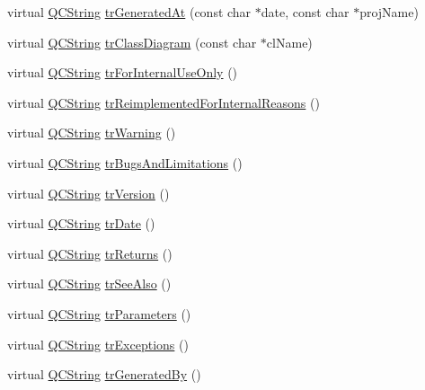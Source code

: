 \begin{DoxyCompactItemize}
\item 
virtual \mbox{\hyperlink{class_q_c_string}{Q\+C\+String}} \mbox{\hyperlink{class_translator_arabic_a044107447821682b67108e2ecfebe8bb}{tr\+Generated\+At}} (const char $\ast$date, const char $\ast$proj\+Name)
\item 
virtual \mbox{\hyperlink{class_q_c_string}{Q\+C\+String}} \mbox{\hyperlink{class_translator_arabic_a87f8377933d06087c5f870a8d72787b6}{tr\+Class\+Diagram}} (const char $\ast$cl\+Name)
\item 
virtual \mbox{\hyperlink{class_q_c_string}{Q\+C\+String}} \mbox{\hyperlink{class_translator_arabic_a18f11fe65de52452965f8b16974c144d}{tr\+For\+Internal\+Use\+Only}} ()
\item 
virtual \mbox{\hyperlink{class_q_c_string}{Q\+C\+String}} \mbox{\hyperlink{class_translator_arabic_a059a6f4e8d6d6be88c0091250b5eba77}{tr\+Reimplemented\+For\+Internal\+Reasons}} ()
\item 
virtual \mbox{\hyperlink{class_q_c_string}{Q\+C\+String}} \mbox{\hyperlink{class_translator_arabic_aff497d8b773ee4c2e8e2c395c6b130b0}{tr\+Warning}} ()
\item 
virtual \mbox{\hyperlink{class_q_c_string}{Q\+C\+String}} \mbox{\hyperlink{class_translator_arabic_aca059592bf0ce2039a8d02a80d425f63}{tr\+Bugs\+And\+Limitations}} ()
\item 
virtual \mbox{\hyperlink{class_q_c_string}{Q\+C\+String}} \mbox{\hyperlink{class_translator_arabic_ab3f45911a62c7c316ed65c8d7454c102}{tr\+Version}} ()
\item 
virtual \mbox{\hyperlink{class_q_c_string}{Q\+C\+String}} \mbox{\hyperlink{class_translator_arabic_a6de935804cfbbf90e35d06b8a94e78c4}{tr\+Date}} ()
\item 
virtual \mbox{\hyperlink{class_q_c_string}{Q\+C\+String}} \mbox{\hyperlink{class_translator_arabic_ab88dc42d6bc73e21be0b5cf4c1cc5ae7}{tr\+Returns}} ()
\item 
virtual \mbox{\hyperlink{class_q_c_string}{Q\+C\+String}} \mbox{\hyperlink{class_translator_arabic_a89ec878fbf206c84597d32e2cf3ecff2}{tr\+See\+Also}} ()
\item 
virtual \mbox{\hyperlink{class_q_c_string}{Q\+C\+String}} \mbox{\hyperlink{class_translator_arabic_a3c12052d296a5979c62e84f4fa372169}{tr\+Parameters}} ()
\item 
virtual \mbox{\hyperlink{class_q_c_string}{Q\+C\+String}} \mbox{\hyperlink{class_translator_arabic_a6eabaaa6157a6ebd1ddccca45d2b42c2}{tr\+Exceptions}} ()
\item 
virtual \mbox{\hyperlink{class_q_c_string}{Q\+C\+String}} \mbox{\hyperlink{class_translator_arabic_ac92207fe531289a746c7271f14c13a0d}{tr\+Generated\+By}} ()

\end{DoxyCompactItemize}
